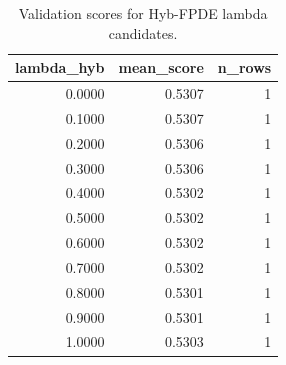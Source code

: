\begin{table}[t]
\caption{Validation scores for Hyb-FPDE lambda candidates.}
\label{tab:lambda_distribution_computed}
\centering
\begin{tabular}{rrr}
\toprule
lambda\_hyb & mean\_score & n\_rows \\
\midrule
0.0000 & 0.5307 & 1 \\
0.1000 & 0.5307 & 1 \\
0.2000 & 0.5306 & 1 \\
0.3000 & 0.5306 & 1 \\
0.4000 & 0.5302 & 1 \\
0.5000 & 0.5302 & 1 \\
0.6000 & 0.5302 & 1 \\
0.7000 & 0.5302 & 1 \\
0.8000 & 0.5301 & 1 \\
0.9000 & 0.5301 & 1 \\
1.0000 & 0.5303 & 1 \\
\bottomrule
\end{tabular}

\end{table}
